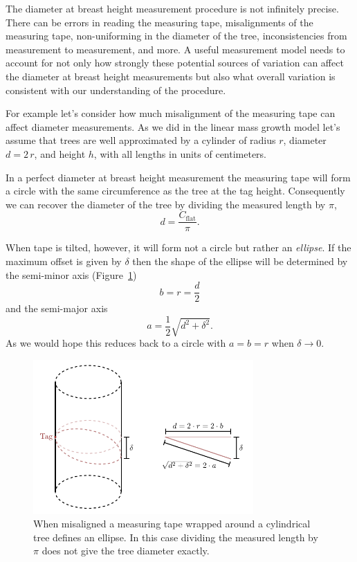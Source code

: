 \documentclass[
  letterpaper,
  DIV=11,
  numbers=noendperiod]{scrartcl}
\begin{document}
The diameter at breast height measurement procedure is not infinitely
precise. There can be errors in reading the measuring tape,
misalignments of the measuring tape, non-uniforming in the diameter of
the tree, inconsistencies from measurement to measurement, and more. A
useful measurement model needs to account for not only how strongly
these potential sources of variation can affect the diameter at breast
height measurements but also what overall variation is consistent with
our understanding of the procedure.

For example let's consider how much misalignment of the measuring tape
can affect diameter measurements. As we did in the linear mass growth
model let's assume that trees are well approximated by a cylinder of
radius \(r\), diameter \(d = 2 \, r\), and height \(h\), with all
lengths in units of centimeters.

In a perfect diameter at breast height measurement the measuring tape
will form a circle with the same circumference as the tree at the tag
height. Consequently we can recover the diameter of the tree by dividing
the measured length by \(\pi\), \[
d = \frac{ C_{\mathrm{flat}} }{ \pi }.
\]

When tape is tilted, however, it will form not a circle but rather an
\emph{ellipse}. If the maximum offset is given by \(\delta\) then the
shape of the ellipse will be determined by the semi-minor axis
(Figure~\ref{fig-measurement}) \[
b = r = \frac{d}{2}
\] and the semi-major axis \[
a = \frac{1}{2} \sqrt{ d^{2} + \delta^{2} }.
\] As we would hope this reduces back to a circle with \(a = b = r\)
when \(\delta \rightarrow 0\).

\begin{figure}

{\centering \includegraphics[width=0.75\textwidth,height=\textheight]{figures/diameter_measurement_error/diameter_measurement_error.pdf}

}

\caption{\label{fig-measurement}When misaligned a measuring tape wrapped
around a cylindrical tree defines an ellipse. In this case dividing the
measured length by \(\pi\) does not give the tree diameter exactly.}

\end{figure}
\end{document}
